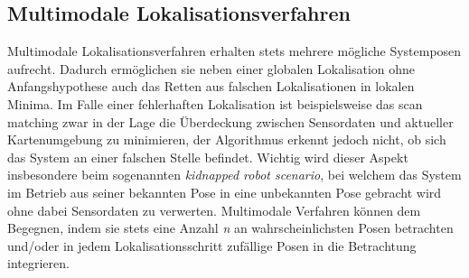 \subsection{Multimodale Lokalisationsverfahren}
Multimodale Lokalisationsverfahren erhalten stets mehrere mögliche Systemposen aufrecht. Dadurch ermöglichen sie neben einer globalen Lokalisation ohne Anfangshypothese auch das Retten aus falschen Lokalisationen in lokalen Minima. Im Falle einer fehlerhaften Lokalisation ist beispielsweise das scan matching zwar in der Lage die Überdeckung zwischen Sensordaten und aktueller Kartenumgebung zu minimieren, der Algorithmus erkennt jedoch nicht, ob sich das System an einer falschen Stelle befindet. Wichtig wird dieser Aspekt insbesondere beim sogenannten \textit{kidnapped robot scenario}, bei welchem das System im Betrieb aus seiner bekannten Pose in eine unbekannten Pose gebracht wird \cite{Yic2011} ohne dabei Sensordaten zu verwerten. Multimodale Verfahren können dem Begegnen, indem sie stets eine Anzahl \textit{n} an wahrscheinlichsten Posen betrachten und/oder in jedem Lokalisationsschritt zufällige Posen in die Betrachtung integrieren.\\
